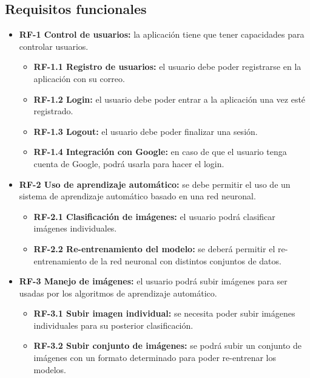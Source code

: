 \subsection{Requisitos funcionales}
\begin{itemize}
\tightlist
\item
  \textbf{RF-1 Control de usuarios:} la aplicación tiene que tener capacidades para controlar usuarios.

  \begin{itemize}
  \tightlist
  \item
    \textbf{RF-1.1 Registro de usuarios:} el usuario debe poder registrarse en la aplicación con su correo.
  \item
    \textbf{RF-1.2 Login:} el usuario debe poder entrar a la aplicación una vez esté registrado.
  \item
    \textbf{RF-1.3 Logout:} el usuario debe poder finalizar una sesión.
  \item
    \textbf{RF-1.4 Integración con Google:} en caso de que el usuario tenga cuenta de Google, podrá usarla para hacer el login.
  \end{itemize}
\item
  \textbf{RF-2 Uso de aprendizaje automático:} se debe permitir el uso de un sistema de aprendizaje automático basado en una red neuronal.
  
  \begin{itemize}
  \tightlist
  \item
    \textbf{RF-2.1 Clasificación de imágenes:} el usuario podrá clasificar imágenes individuales.
  \item
    \textbf{RF-2.2 Re-entrenamiento del modelo:} se deberá permitir el re-entrenamiento de la red neuronal con distintos conjuntos de datos.
    
  \end{itemize}
\item
  \textbf{RF-3 Manejo de imágenes:} el usuario podrá subir imágenes para ser usadas por los algoritmos de aprendizaje automático.
  
  \begin{itemize}
  \tightlist
  \item
    \textbf{RF-3.1 Subir imagen individual:} se necesita poder subir imágenes individuales para su posterior clasificación.
  \item
    \textbf{RF-3.2 Subir conjunto de imágenes:} se podrá subir un conjunto de imágenes con un formato determinado para poder re-entrenar los modelos.    
  \end{itemize}
\end{itemize}


